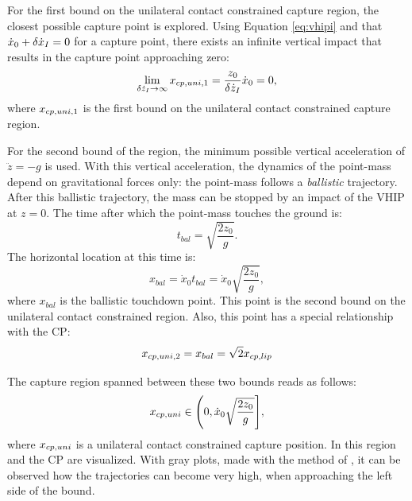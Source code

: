 For the first bound on the unilateral contact constrained capture region, the closest possible capture point is explored. Using Equation \ref{eq:vhipi} and that $\dot{x}_0+\delta \dot{x}_I=0$ for a capture point, there exists an infinite vertical impact that results in the capture point approaching zero:
\begin{equation}
	\lim_{\delta \dot{z}_I \to \infty} x_{cp,uni,1} = \frac{z_0}{\delta \dot{z}_I}\dot{x}_0 = 0,
\end{equation}
where $x_{cp,uni,1}$ is the first bound on the unilateral contact constrained capture region.

For the second bound of the region, the minimum possible vertical acceleration of  $\ddot{z} = -g$ is used. With this vertical acceleration, the dynamics of the point-mass depend on gravitational forces only: the point-mass follows a \textit{ballistic} trajectory. After this ballistic trajectory, the mass can be stopped by an impact of the \ac{VHIP} at $z=0$. The time after which the point-mass touches the ground is:
\begin{equation}\label{eq:tbal}
	t_{bal} = \sqrt{\frac{2z_0}{g}}.
\end{equation}
The horizontal location at this time is:
\begin{equation}
	x_{bal}= \dot{x}_0t_{bal}=\dot{x}_0\sqrt{\frac{2z_0}{g}},
	\label{eq:xbal}
\end{equation}
where $x_{bal}$ is the ballistic touchdown point. This point is the second bound on the unilateral contact constrained region. Also, this point has a special relationship with the \ac{CP}:
\begin{equation}
    x_{cp,uni,2} = x_{bal}=\sqrt{2}x_{cp,lip}
\end{equation}


The capture region spanned between these two bounds reads as follows:
\begin{equation}
x_{cp,uni} \in \Bigg(0, \dot{x}_0\sqrt{\frac{2z_0}{g}} \Bigg],
\label{eq:xcpuni}
\end{equation}
where $x_{cp,uni}$ is a unilateral contact constrained capture position. In  this region and the \ac{CP} are visualized. With gray plots, made with the method of \cite{koolen2016balance}, it can be observed how the trajectories can become very high, when approaching the left side of the bound.  

